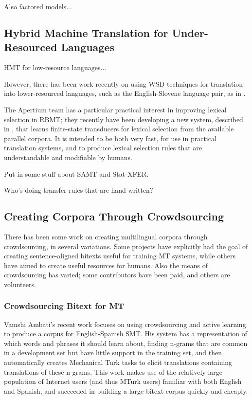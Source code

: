 Also factored models...
\cite{yeniterzi-oflazer:2010:ACL}

\subsection{Hybrid Machine Translation for Under-Resourced Languages}
HMT for low-resource languages...

However, there has been work recently on using WSD techniques for translation
into lower-resourced languages, such as the English-Slovene language pair, as
in \cite{vintar-fivser-vrvsvcaj:2012:ESIRMT-HyTra2012}. 

The Apertium team has a particular practical interest in improving lexical
selection in RBMT; they recently have been developing
a new system, described in \cite{tyers-fst}, that learns finite-state
transducers for lexical selection from the available parallel corpora. It is
intended to be both very fast, for use in practical translation systems, and
to produce lexical selection rules that are understandable and modifiable by
humans.

Put in some stuff about SAMT and Stat-XFER.

Who's doing transfer rules that are hand-written?


\subsection{Creating Corpora Through Crowdsourcing}
There has been some work on creating multilingual corpora through
crowdsourcing, in several variations. Some projects have explicitly had the
goal of creating sentence-aligned bitexts useful for training MT systems, while
others have aimed to create useful resources for humans. Also the means of
crowdsourcing has varied; some contributors have been paid, and others are
volunteers.

\subsubsection{Crowdsourcing Bitext for MT}
Vamshi Ambati's recent work \cite{ambati_naacl,ambati_act} focuses on using
crowdsourcing and active learning to produce a corpus for English-Spanish SMT.
His system has a representation of which words and phrases it should learn
about, finding n-grams that are common in a development set but have little
support in the training set, and then automatically creates Mechanical Turk
tasks to elicit translations containing translations of these n-grams. This
work makes use of the relatively large population of Internet users (and thus
MTurk users) familiar with both English and Spanish, and succeeded in building
a large bitext corpus quickly and cheaply.


